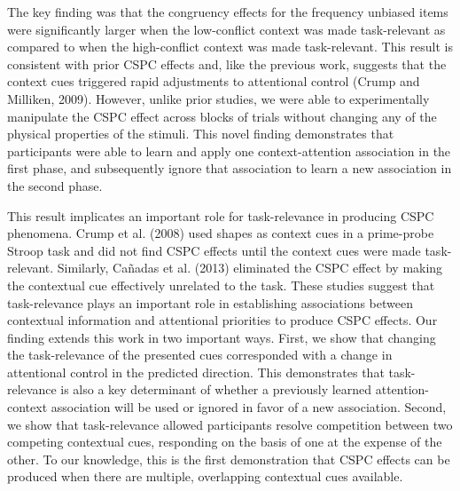 \documentclass[]{DissertateCUNY}
\begin{document}
The key finding was that the congruency effects for the frequency
unbiased items were significantly larger when the low-conflict context
was made task-relevant as compared to when the high-conflict context was
made task-relevant. This result is consistent with prior CSPC effects
and, like the previous work, suggests that the context cues triggered
rapid adjustments to attentional control (Crump and Milliken, 2009).
However, unlike prior studies, we were able to experimentally manipulate
the CSPC effect across blocks of trials without changing any of the
physical properties of the stimuli. This novel finding demonstrates that
participants were able to learn and apply one context-attention
association in the first phase, and subsequently ignore that association
to learn a new association in the second phase.

This result implicates an important role for task-relevance in producing
CSPC phenomena. Crump et al. (2008) used shapes as context cues in a
prime-probe Stroop task and did not find CSPC effects until the context
cues were made task-relevant. Similarly, Cañadas et al. (2013)
eliminated the CSPC effect by making the contextual cue effectively
unrelated to the task. These studies suggest that task-relevance plays
an important role in establishing associations between contextual
information and attentional priorities to produce CSPC effects. Our
finding extends this work in two important ways. First, we show that
changing the task-relevance of the presented cues corresponded with a
change in attentional control in the predicted direction. This
demonstrates that task-relevance is also a key determinant of whether a
previously learned attention-context association will be used or ignored
in favor of a new association. Second, we show that task-relevance
allowed participants resolve competition between two competing
contextual cues, responding on the basis of one at the expense of the
other. To our knowledge, this is the first demonstration that CSPC
effects can be produced when there are multiple, overlapping contextual
cues available.
\end{document}
